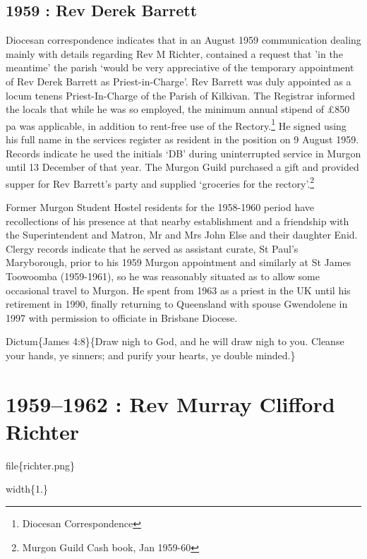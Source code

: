 \hypertarget{rev-derek-barrett}{%
\section{1959 : Rev Derek Barrett}\label{rev-derek-barrett}}

Diocesan correspondence indicates that in an August 1959 communication dealing mainly with details regarding Rev M Richter, contained a request that 'in the meantime' the parish `would be very appreciative of the temporary appointment of Rev Derek Barrett as Priest-in-Charge'. Rev Barrett was duly appointed as a locum tenens Priest-In-Charge of the Parish of Kilkivan. The Registrar informed the locals that while he was so employed, the minimum annual stipend of £850 pa was applicable, in addition to rent-free use of the Rectory.\footnote{Diocesan Correspondence} He signed using his full name in the services register as resident in the position on 9 August 1959. Records indicate he used the initials `DB' during uninterrupted service in Murgon until 13 December of that year. The Murgon Guild purchased a gift and provided supper for Rev Barrett's party and supplied `groceries for the rectory'.\footnote{Murgon Guild Cash book, Jan 1959-60}

Former Murgon Student Hostel residents for the 1958-1960 period have recollections of his presence at that nearby establishment and a friendship with the Superintendent and Matron, Mr and Mrs John Else and their daughter Enid. Clergy records indicate that he served as assistant curate, St Paul's Maryborough, prior to his 1959 Murgon appointment and similarly at St James Toowoomba (1959-1961), so he was reasonably situated as to allow some occasional travel to Murgon. He spent from 1963 as a priest in the UK until his retirement in 1990, finally returning to Queensland with spouse Gwendolene in 1997 with permission to officiate in Brisbane Diocese.

Dictum\{James 4:8\}\{Draw nigh to God, and he will draw nigh to you. Cleanse your hands, ye sinners; and purify your hearts, ye double minded.\}

\hypertarget{rev-murray-clifford-richter}{%
\chapter{1959--1962 : Rev Murray Clifford Richter}\label{rev-murray-clifford-richter}}

file\{richter.png\}

width\{1.\}

